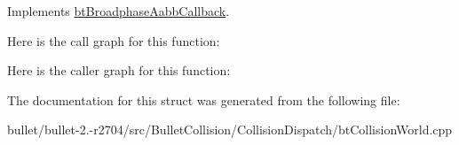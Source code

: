Implements \hyperlink{structbt_broadphase_aabb_callback}{bt\+Broadphase\+Aabb\+Callback}.



Here is the call graph for this function\+:




Here is the caller graph for this function\+:




The documentation for this struct was generated from the following file\+:\begin{DoxyCompactItemize}
\item 
bullet/bullet-\/2.-\/r2704/src/\+Bullet\+Collision/\+Collision\+Dispatch/bt\+Collision\+World.\+cpp\end{DoxyCompactItemize}

